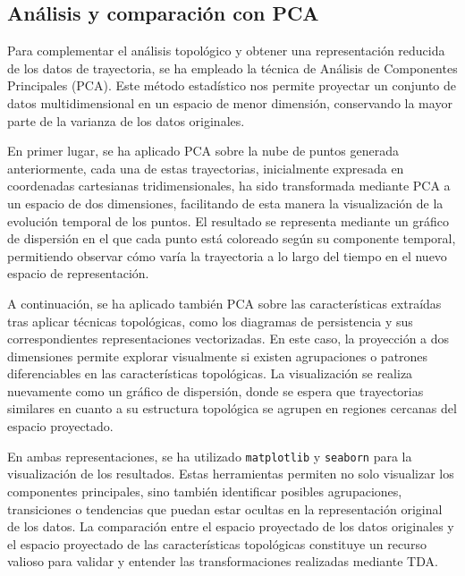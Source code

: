 \subsection{Análisis y comparación con PCA}

Para complementar el análisis topológico y obtener una representación reducida de los datos de trayectoria, se ha empleado la técnica de Análisis de Componentes Principales (PCA). Este método estadístico nos permite proyectar un conjunto de datos multidimensional en un espacio de menor dimensión, conservando la mayor parte de la varianza de los datos originales.

\vspace{0.2cm}

En primer lugar, se ha aplicado PCA sobre la nube de puntos generada anteriormente, cada una de estas trayectorias, inicialmente expresada en coordenadas cartesianas tridimensionales, ha sido transformada mediante PCA a un espacio de dos dimensiones, facilitando de esta manera la visualización de la evolución temporal de los puntos. El resultado se representa mediante un gráfico de dispersión en el que cada punto está coloreado según su componente temporal, permitiendo observar cómo varía la trayectoria a lo largo del tiempo en el nuevo espacio de representación.

\vspace{0.2cm}

A continuación, se ha aplicado también PCA sobre las características extraídas tras aplicar técnicas topológicas, como los diagramas de persistencia y sus correspondientes representaciones vectorizadas. En este caso, la proyección a dos dimensiones permite explorar visualmente si existen agrupaciones o patrones diferenciables en las características topológicas. La visualización se realiza nuevamente como un gráfico de dispersión, donde se espera que trayectorias similares en cuanto a su estructura topológica se agrupen en regiones cercanas del espacio proyectado.

\vspace{0.2cm}

En ambas representaciones, se ha utilizado \texttt{matplotlib} y \texttt{seaborn} para la visualización de los resultados. Estas herramientas permiten no solo visualizar los componentes principales, sino también identificar posibles agrupaciones, transiciones o tendencias que puedan estar ocultas en la representación original de los datos. La comparación entre el espacio proyectado de los datos originales y el espacio proyectado de las características topológicas constituye un recurso valioso para validar y entender las transformaciones realizadas mediante TDA.


